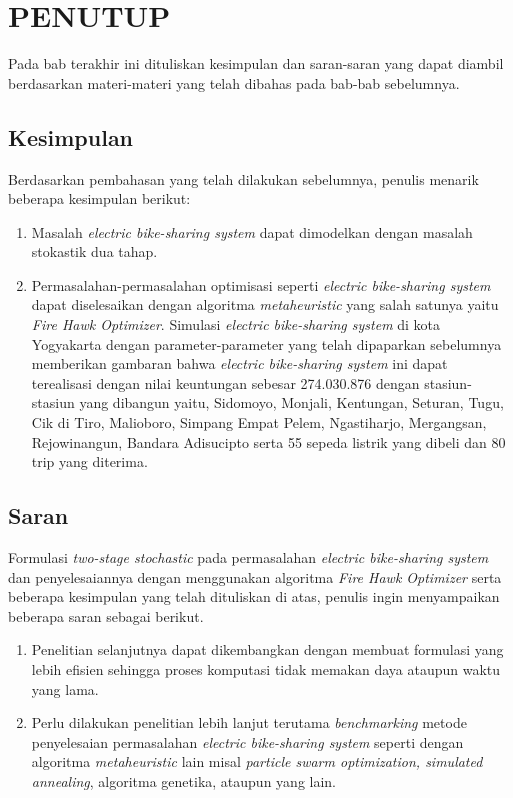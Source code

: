 \chapter{PENUTUP}

Pada bab terakhir ini dituliskan kesimpulan dan saran-saran yang dapat diambil berdasarkan materi-materi yang telah dibahas pada bab-bab sebelumnya.

\section{Kesimpulan}
Berdasarkan pembahasan yang telah dilakukan sebelumnya, penulis menarik beberapa kesimpulan berikut:
\begin{enumerate}
    \item Masalah \textit{electric bike-sharing system} dapat dimodelkan dengan masalah stokastik dua tahap.
    \item Permasalahan-permasalahan optimisasi seperti \textit{electric bike-sharing system} dapat diselesaikan dengan algoritma \textit{metaheuristic} yang salah satunya yaitu \textit{Fire Hawk Optimizer}. Simulasi \textit{electric bike-sharing system} di kota Yogyakarta dengan parameter-parameter yang telah dipaparkan sebelumnya memberikan gambaran bahwa \textit{electric bike-sharing system} ini dapat terealisasi dengan nilai keuntungan sebesar 274.030.876 dengan stasiun-stasiun yang dibangun yaitu, Sidomoyo, Monjali, Kentungan, Seturan, Tugu, Cik di Tiro, Malioboro, Simpang Empat Pelem, Ngastiharjo, Mergangsan, Rejowinangun, Bandara Adisucipto serta 55 sepeda listrik yang dibeli dan 80 trip yang diterima.
\end{enumerate}

\section{Saran}
Formulasi \textit{two-stage stochastic} pada permasalahan \textit{electric bike-sharing system} dan penyelesaiannya dengan menggunakan algoritma \textit{Fire Hawk Optimizer} serta beberapa kesimpulan yang telah dituliskan di atas,  penulis ingin menyampaikan beberapa saran sebagai berikut.
\begin{enumerate}
    \item Penelitian selanjutnya dapat dikembangkan dengan membuat formulasi yang lebih efisien sehingga proses komputasi tidak memakan daya ataupun waktu yang lama.
    \item Perlu dilakukan penelitian lebih lanjut terutama \textit{benchmarking} metode penyelesaian permasalahan \textit{electric bike-sharing system} seperti dengan algoritma \textit{metaheuristic} lain misal \textit{particle swarm optimization, simulated annealing}, algoritma genetika, ataupun yang lain.
\end{enumerate}